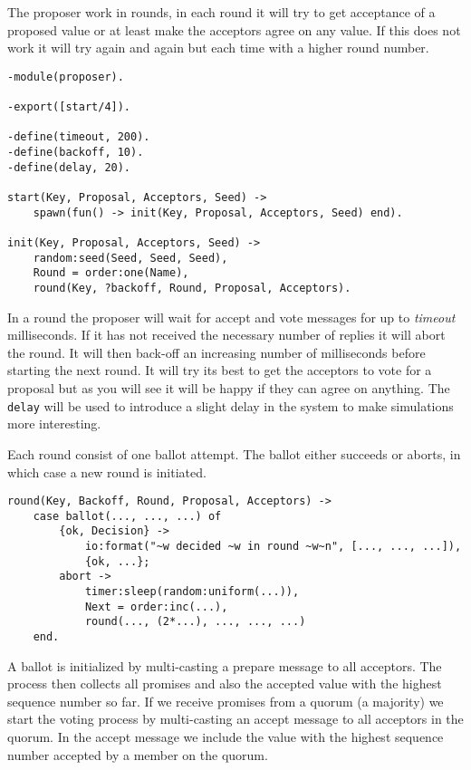 \documentclass[a4paper,11pt]{article}
\begin{document}
The proposer work in rounds, in each round it will try to get
acceptance of a proposed value or at least make the acceptors agree on
any value. If this does not work it will try again and again but each
time with a higher round number. 

\begin{verbatim}
-module(proposer).

-export([start/4]).

-define(timeout, 200).
-define(backoff, 10).
-define(delay, 20).

start(Key, Proposal, Acceptors, Seed) ->
    spawn(fun() -> init(Key, Proposal, Acceptors, Seed) end).

init(Key, Proposal, Acceptors, Seed) ->
    random:seed(Seed, Seed, Seed),
    Round = order:one(Name),
    round(Key, ?backoff, Round, Proposal, Acceptors).
\end{verbatim}

In a round the proposer will wait for accept and vote messages for up
to {\em timeout} milliseconds. If it has not received the necessary
number of replies it will abort the round. It will then back-off an
increasing number of milliseconds before starting the next round. It
will try its best to get the acceptors to vote for a proposal but as
you will see it will be happy if they can agree on anything. The {\tt
  delay} will be used to introduce a slight delay in the system to
make simulations more interesting.

Each round consist of one ballot attempt. The ballot either succeeds or
aborts, in which case a new round is initiated.

\begin{verbatim}
round(Key, Backoff, Round, Proposal, Acceptors) ->
    case ballot(..., ..., ...) of
        {ok, Decision} ->
            io:format("~w decided ~w in round ~w~n", [..., ..., ...]),
            {ok, ...};
        abort ->
            timer:sleep(random:uniform(...)),
            Next = order:inc(...),
            round(..., (2*...), ..., ..., ...)
    end.
\end{verbatim}

A ballot is initialized by multi-casting a prepare message to all
acceptors. The process then collects all promises and also the
accepted value with the highest sequence number so far. If we receive
promises from a quorum (a majority) we start the voting process by
multi-casting an accept message to all acceptors in the quorum. In the
accept message we include the value with the highest sequence number
accepted by a member on the quorum.
\end{document}
